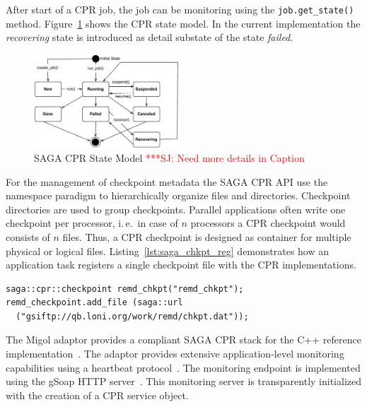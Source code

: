 \documentclass[times, 10pt,twocolumn]{article}
\newcommand{\jhanote}[1]{ {\textcolor{red} { ***SJ: #1 }}}
\begin{document}
After start of a CPR job, the job can be monitoring using the \texttt{job.get\_state()} method. Figure~\ref{fig:cpr-statemodel} shows the CPR state model. In the current implementation the \emph{recovering} state is introduced as detail substate of the state \emph{failed}.
\begin{figure}[th]
    \centering
        \includegraphics[width=0.48\textwidth]{cpr-statemodel.pdf}
    \caption{SAGA CPR State Model \jhanote{Need more details in Caption} }
    \label{fig:cpr-statemodel}
\end{figure}
                               

For the management of checkpoint metadata the SAGA CPR API use the namespace paradigm to hierarchically 
organize files and directories. Checkpoint directories are 
used to group checkpoints. Parallel applications often write one checkpoint per 
processor, i.\,e.\ in case of $n$ processors a CPR checkpoint
would consists of $n$ files. Thus, a CPR checkpoint is designed as container 
for multiple physical or logical files. Listing~\ref{lst:saga_chkpt_reg} demonstrates how an application task registers a single checkpoint file with the CPR implementations.     
\begin{lstlisting}[style=myListing, caption={SAGA CPR: Register Checkpoint with Migol}, label={lst:saga_chkpt_reg}]
saga::cpr::checkpoint remd_chkpt("remd_chkpt");
remd_checkpoint.add_file (saga::url 
  ("gsiftp://qb.loni.org/work/remd/chkpt.dat"));
\end{lstlisting}
                        

The Migol adaptor provides a compliant SAGA CPR stack for the C++ reference implementation~\cite{Kaiser:2006qp}. The adaptor provides extensive application-level monitoring capabilities using a heartbeat protocol~\cite{Hanmer:2007kx}. The monitoring endpoint is implemented using the gSoap HTTP server~\cite{gsoap}. This monitoring server is transparently initialized with the creation of a CPR service object. 

\end{document}

